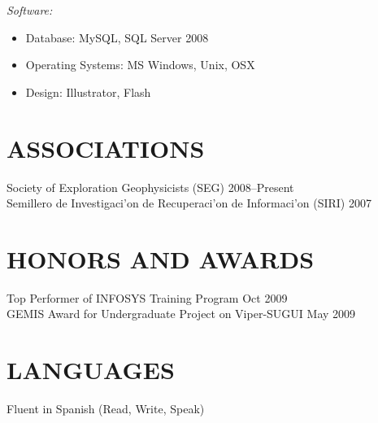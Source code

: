 \documentclass[line,margin]{res}
\begin{document}
\begin{resume}
    {\sl Software:}
    \begin{itemize} \itemsep -2pt
        \item Database: MySQL, SQL Server 2008
        \item Operating Systems: MS Windows, Unix, OSX
        \item Design: Illustrator, Flash
    \end{itemize} 

\section{ASSOCIATIONS} %
\label{sec:associations}
    Society of Exploration Geophysicists (SEG) \hfill 2008--Present\\
    Semillero de Investigaci\a'on de Recuperaci\a'on de Informaci\a'on (SIRI) \hfill 2007\\

\section{HONORS AND AWARDS} %
\label{sec:honors_and_awards}
    Top Performer of INFOSYS Training Program \hfill Oct 2009\\
    GEMIS Award for Undergraduate Project on Viper-SUGUI \hfill May 2009\\

\section{LANGUAGES} %
\label{sec:languages}
    Fluent in Spanish (Read, Write, Speak)

\end{resume}
\end{document}
